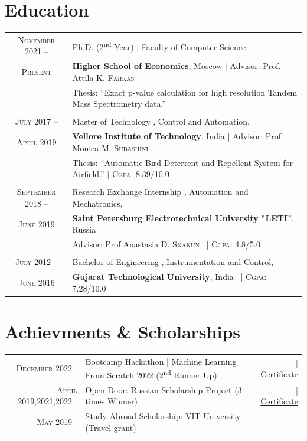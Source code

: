 \documentclass[a4paper,10pt]{article} %
\begin{document}
\section{Education}
\begin{tabular}{cp{15.5cm}}	
\textsc{November} 2021 --  & {Ph.D.} {(2\textsuperscript{nd} Year)} , Faculty of Computer Science, \\
\textsc{Present}& \textbf{Higher School of Economics}, Moscow | \scriptsize Advisor: Prof. Attila K. \textsc{Farkas} \\
& \scriptsize Thesis: ``Exact p-value calculation for high resolution Tandem Mass Spectrometry data.'' \\
\\
\textsc{July} 2017 --  & Master of Technology , Control and Automation, \\
\textsc{April} 2019& \textbf{Vellore Institute of Technology}, India | \scriptsize Advisor: Prof. Monica M. \textsc{Subashini} \\
& \scriptsize  Thesis: ``Automatic Bird Deterrent and Repellent System for Airfield.'' | \normalsize \textsc{Cgpa}: 8.39/10.0  \\
\\
\textsc{September} 2018 --  & Research Exchange Internship , Automation and Mechatronics, \\
\textsc{June} 2019& \textbf{Saint Petersburg Electrotechnical University "LETI"}, Russia \\
& \scriptsize Advisor: Prof.Anastasia  D. \textsc{Skakun} \qquad \qquad \qquad  \qquad \qquad \qquad \qquad \quad \: \ | \normalsize \textsc{Cgpa}: 4.8/5.0  \\
\\
\textsc{July} 2012 --  & Bachelor of Engineering , Instrumentation and Control, \\
\textsc{June} 2016& \textbf{Gujarat Technological University}, India \qquad \qquad \ | \normalsize \textsc{Cgpa}: 7.28/10.0\\
\end{tabular}


\section{Achievments \& Scholarships }
\begin{tabular}{rp{8cm}r}
	\textsc{December} 2022 | & Bootcamp Hackathon | Machine Learning From Scratch 2022 \footnotesize(2\textsuperscript{nd} Runner Up)\normalsize&\href{https://www.hse.ru/ma/mds/hackathon/}{\hfill | \footnotesize Certificate}\\
	
	\textsc{April} 2019,2021,2022 | & Open Door: Russian Scholarship Project \scriptsize(3-times Winner)&\href{https://www.od.globaluni.ru/en/}{\hfill | \footnotesize Certificate}\\
	\vspace*{20pt}	
	\textsc{May} 2019 | & Study Abroad Scholarship: VIT University \scriptsize(Travel grant)
\end{tabular}
\end{document}
